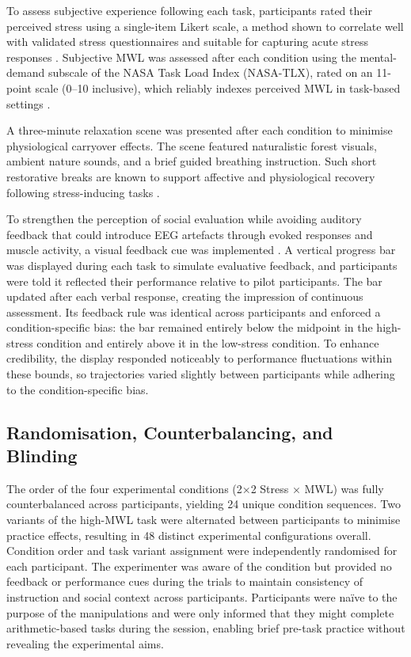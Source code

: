 \documentclass[lettersize,journal]{IEEEtran}
\begin{document}
To assess subjective experience following each task, participants rated their perceived stress using a single-item Likert scale, a method shown to correlate well with validated stress questionnaires and suitable for capturing acute stress responses \cite{littmanReliabilityValidity22006}. Subjective MWL was assessed after each condition using the mental-demand subscale of the NASA Task Load Index (NASA-TLX), rated on an 11-point scale (0–10 inclusive), which reliably indexes perceived MWL in task-based settings \cite{hartDevelopmentNASATLXTask1988}.

A three-minute relaxation scene was presented after each condition to minimise physiological carryover effects. The scene featured naturalistic forest visuals, ambient nature sounds, and a brief guided breathing instruction. Such short restorative breaks are known to support affective and physiological recovery following stress-inducing tasks \cite{chanNatureVirtualReality2021, albulescuGiveMeBreak2022, kumpulainenAssessingWellbeingBenefits2024}.

To strengthen the perception of social evaluation while avoiding auditory feedback that could introduce EEG artefacts through evoked responses and muscle activity, a visual feedback cue was implemented \cite{ahissarSpeechComprehensionCorrelated2001}. A vertical progress bar was displayed during each task to simulate evaluative feedback, and participants were told it reflected their performance relative to pilot participants. The bar updated after each verbal response, creating the impression of continuous assessment. Its feedback rule was identical across participants and enforced a condition-specific bias: the bar remained entirely below the midpoint in the high-stress condition and entirely above it in the low-stress condition. To enhance credibility, the display responded noticeably to performance fluctuations within these bounds, so trajectories varied slightly between participants while adhering to the condition-specific bias. 

\subsection{Randomisation, Counterbalancing, and Blinding}
The order of the four experimental conditions (2×2 Stress × MWL) was fully counterbalanced across participants, yielding 24 unique condition sequences. Two variants of the high-MWL task were alternated between participants to minimise practice effects, resulting in 48 distinct experimental configurations overall. Condition order and task variant assignment were independently randomised for each participant. The experimenter was aware of the condition but provided no feedback or performance cues during the trials to maintain consistency of instruction and social context across participants. Participants were naïve to the purpose of the manipulations and were only informed that they might complete arithmetic-based tasks during the session, enabling brief pre-task practice without revealing the experimental aims.
\end{document}
